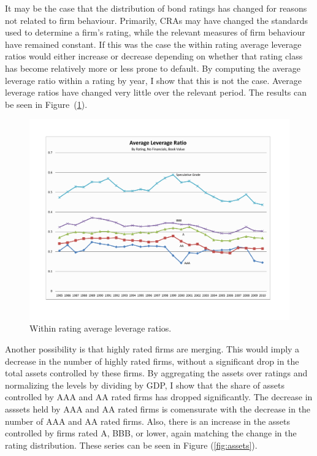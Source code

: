 \documentclass[notitlepage]{article}
\begin{document}
It may be the case that the distribution of bond ratings has changed for reasons not related to firm behaviour. Primarily, CRAs may have changed the standards used to determine a firm's rating, while the relevant measures of firm behaviour have remained constant. If this was the case the within rating average leverage ratios would either increase or decrease depending on whether that rating class has become relatively more or less prone to default. By computing the average leverage ratio within a rating by year, I show that this is not the case. Average leverage ratios have changed very little over the relevant period. The results can be seen in Figure~(\ref{fig:avg_lev}). 

\begin{figure}[ht]
\centering
	\includegraphics[width=\textwidth]{avg_leverage_bv_nofin.pdf}
	\caption{Within rating average leverage ratios.}
	\label{fig:avg_lev}
\end{figure}

Another possibility is that highly rated firms are merging. This would imply a decrease in the number of highly rated firms, without a significant drop in the total assets controlled by these firms. By aggregating the assets over ratings and normalizing the levels by dividing by GDP, I show that the share of assets controlled by AAA and AA rated firms has dropped significantly. The decrease in asssets held by AAA and AA rated firms is comensurate with the decrease in the number of AAA and AA rated firms. Also, there is an increase in the assets controlled by firms rated A, BBB, or lower, again matching the change in the rating distribution. These series can be seen in Figure (\ref{fig:assets}). 
\end{document}
